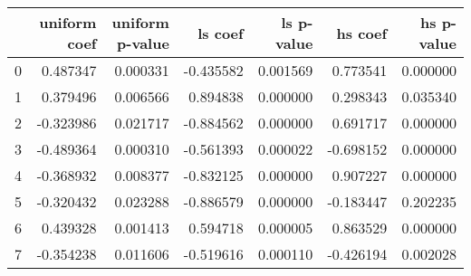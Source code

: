 \begin{tabular}{lrrrrrr}
\toprule
 & uniform coef & uniform p-value & ls coef & ls p-value & hs coef & hs p-value \\
\midrule
0 & 0.487347 & 0.000331 & -0.435582 & 0.001569 & 0.773541 & 0.000000 \\
1 & 0.379496 & 0.006566 & 0.894838 & 0.000000 & 0.298343 & 0.035340 \\
2 & -0.323986 & 0.021717 & -0.884562 & 0.000000 & 0.691717 & 0.000000 \\
3 & -0.489364 & 0.000310 & -0.561393 & 0.000022 & -0.698152 & 0.000000 \\
4 & -0.368932 & 0.008377 & -0.832125 & 0.000000 & 0.907227 & 0.000000 \\
5 & -0.320432 & 0.023288 & -0.886579 & 0.000000 & -0.183447 & 0.202235 \\
6 & 0.439328 & 0.001413 & 0.594718 & 0.000005 & 0.863529 & 0.000000 \\
7 & -0.354238 & 0.011606 & -0.519616 & 0.000110 & -0.426194 & 0.002028 \\
\bottomrule
\end{tabular}
